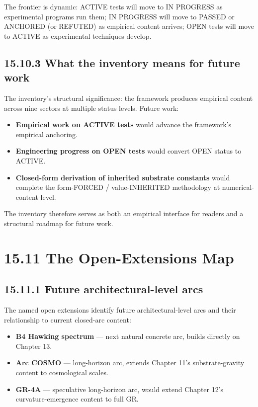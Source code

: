 \documentclass[11pt]{book}
\begin{document}
The frontier is dynamic: ACTIVE tests will move to IN PROGRESS as experimental programs run them; IN PROGRESS will move to PASSED or ANCHORED (or REFUTED) as empirical content arrives; OPEN tests will move to ACTIVE as experimental techniques develop.

\subsection{15.10.3 What the inventory means for future work}

The inventory's structural significance: the framework produces empirical content across nine sectors at multiple status levels. Future work:
\begin{itemize}
\item \textbf{Empirical work on ACTIVE tests} would advance the framework's empirical anchoring.
\item \textbf{Engineering progress on OPEN tests} would convert OPEN status to ACTIVE.
\item \textbf{Closed-form derivation of inherited substrate constants} would complete the form-FORCED / value-INHERITED methodology at numerical-content level.
\end{itemize}

The inventory therefore serves as both an empirical interface for readers and a structural roadmap for future work.

\section{15.11 The Open-Extensions Map}

\subsection{15.11.1 Future architectural-level arcs}

The named open extensions identify future architectural-level arcs and their relationship to current closed-arc content:

\begin{itemize}
\item \textbf{B4 Hawking spectrum} — next natural concrete arc, builds directly on Chapter 13.
\item \textbf{Arc COSMO} — long-horizon arc, extends Chapter 11's substrate-gravity content to cosmological scales.
\item \textbf{GR-4A} — speculative long-horizon arc, would extend Chapter 12's curvature-emergence content to full GR.
\end{itemize}
\end{document}
